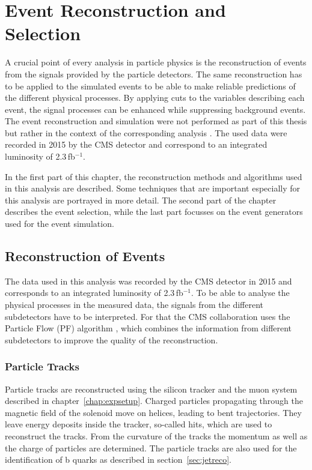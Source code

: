 \chapter{Event Reconstruction and Selection}
\label{chap::EventReconstructionandSelection}
A crucial point of every analysis in particle physics is the reconstruction of events from the signals provided by the particle detectors. The same reconstruction has to be applied to the simulated events to be able to make reliable predictions of the different physical processes. By applying cuts to the variables describing each event, the signal processes can be enhanced while suppressing background events. The event reconstruction and simulation were not performed as part of this thesis but rather in the context of the corresponding analysis \cite{PAS}. The used data were recorded in 2015 by the CMS detector and correspond to an integrated luminosity of 2.3\,fb$^{-1}$.

\noindent In the first part of this chapter, the reconstruction methods and algorithms used in this analysis are described. Some techniques that are important especially for this analysis are portrayed in more detail. The second part of the chapter describes the event selection, while the last part focusses on the event generators used for the event simulation. 
\section{Reconstruction of Events}
The data used in this analysis was recorded by the CMS detector in 2015 and corresponds to an integrated luminosity of 2.3\,fb$^{-1}$. To be able to analyse the physical processes in the measured data, the signals from the different subdetectors have to be interpreted. For that the CMS collaboration uses the Particle Flow (PF) algorithm \cite{PF1,PF2}, which combines the information from different subdetectors to improve the quality of the reconstruction.
\subsection{Particle Tracks}
\label{sec:trackreco}
Particle tracks are reconstructed using the silicon tracker and the muon system described in chapter~\ref{chap:expsetup}. Charged particles propagating through the magnetic field of the solenoid move on helices, leading to bent trajectories. They leave energy deposits inside the tracker, so-called hits, which are used to reconstruct the tracks. From the curvature of the tracks the momentum as well as the charge of particles are determined. The particle tracks are also used for the identification of b quarks as described in section~\ref{sec:jetreco}.\\

